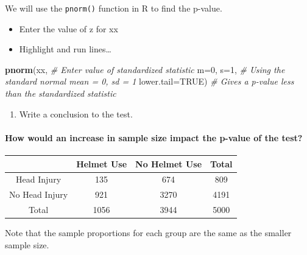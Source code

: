 \documentclass[
]{report}
\newenvironment{Shaded}{\begin{snugshade}}{\end{snugshade}}
\newcommand{\AttributeTok}[1]{\textcolor[rgb]{0.13,0.29,0.53}{#1}}
\newcommand{\CommentTok}[1]{\textcolor[rgb]{0.56,0.35,0.01}{\textit{#1}}}
\newcommand{\ConstantTok}[1]{\textcolor[rgb]{0.56,0.35,0.01}{#1}}
\newcommand{\DecValTok}[1]{\textcolor[rgb]{0.00,0.00,0.81}{#1}}
\newcommand{\FunctionTok}[1]{\textcolor[rgb]{0.13,0.29,0.53}{\textbf{#1}}}
\newcommand{\NormalTok}[1]{#1}
\providecommand{\tightlist}{%
  \setlength{\itemsep}{0pt}\setlength{\parskip}{0pt}}
\begin{document}
\vspace{0.6in}

We will use the \texttt{pnorm()} function in R to find the p-value.

\begin{itemize}
\item
  Enter the value of z for xx
\item
  Highlight and run lines\ldots{}
\end{itemize}

\begin{Shaded}
\begin{Highlighting}[]
\FunctionTok{pnorm}\NormalTok{(xx, }\CommentTok{\# Enter value of standardized statistic}
      \AttributeTok{m=}\DecValTok{0}\NormalTok{, }\AttributeTok{s=}\DecValTok{1}\NormalTok{, }\CommentTok{\# Using the standard normal mean = 0, sd = 1}
      \AttributeTok{lower.tail=}\ConstantTok{TRUE}\NormalTok{) }\CommentTok{\# Gives a p{-}value less than the standardized statistic}
\end{Highlighting}
\end{Shaded}

\begin{enumerate}
\def\labelenumi{\arabic{enumi}.}
\setcounter{enumi}{8}
\tightlist
\item
  Write a conclusion to the test.
\end{enumerate}

\vspace{1in}

\paragraph*{How would an increase in sample size impact the p-value of the test?}\label{how-would-an-increase-in-sample-size-impact-the-p-value-of-the-test}

\begin{longtable}[]{@{}cccc@{}}
\toprule\noalign{}
& Helmet Use & No Helmet Use & Total \\
\midrule\noalign{}
\endhead
\bottomrule\noalign{}
\endlastfoot
Head Injury & 135 & 674 & 809 \\
No Head Injury & 921 & 3270 & 4191 \\
Total & 1056 & 3944 & 5000 \\
\end{longtable}

Note that the sample proportions for each group are the same as the smaller sample size.
\end{document}
